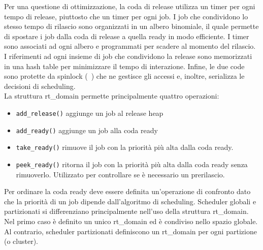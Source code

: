 Per una questione di ottimizzazione, la coda di release utilizza un timer per ogni tempo di release, piuttosto che un timer per ogni job. I job che condividono lo stesso tempo di rilascio sono organizzati in un albero binomiale, il quale permette di spostare i job dalla coda di release a quella ready in modo efficiente. I timer sono associati ad ogni albero e programmati per scadere al momento del rilascio. I riferimenti ad ogni insieme di job che condividono la release sono memorizzati in una hash table per minimizzare il tempo di interazione. Infine, le due code sono protette da spinlock (~\cite{spinlock:linus}) che ne gestisce gli accessi e, inoltre, serializza le decisioni di scheduling.\\

La struttura rt\_domain permette principalmente quattro operazioni:

\begin{itemize}
\item \texttt{add\_release()} aggiunge un job al release heap
\item \texttt{add\_ready()} aggiunge un job alla coda ready
\item \texttt{take\_ready()} rimuove il job con la priorità più alta dalla coda ready. 
\item \texttt{peek\_ready()} ritorna il job con la priorità più alta dalla coda ready senza rimuoverlo. Utilizzato per controllare se è necessario un prerilascio.
\end{itemize}

Per ordinare la coda ready deve essere definita un'operazione di confronto dato che la priorità di un job dipende dall'algoritmo di scheduling.
Scheduler globali e partizionati si differenziano principalmente nell'uso della struttura rt\_domain. Nel primo caso è definito un unico rt\_domain ed è condiviso nello spazio globale. Al contrario, scheduler partizionati definiscono un rt\_domain per ogni partizione (o cluster).\\